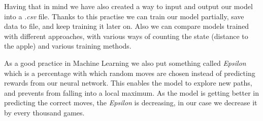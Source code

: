 \documentclass[]{article}
\begin{document}
\par Having that in mind we have also created a way to input and output our model into a \textit{.csv} file. Thanks to this practise we can train our model partially, save data to file, and keep training it later on. Also we can compare models trained with different approaches, with various ways of counting the state (distance to the apple) and various training methods. 

\par As a good practice in Machine Learning we also put something called \textit{Epsilon} which is a percentage with which random moves are chosen instead of predicting rewards from our neural network. This enables the model to explore new paths, and prevents from falling into a local maximum. As the model is getting better in predicting the correct moves, the \textit{Epsilon} is decreasing, in our case we decrease it by every thousand games. 
\end{document}
